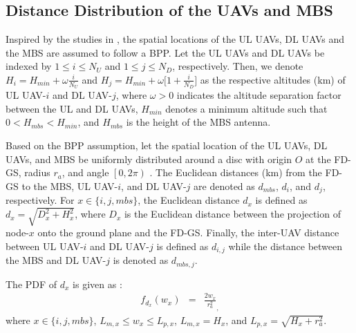\subsection{Distance Distribution of the UAVs and MBS}

Inspired by the studies in \cite{chetlur2017downlink, wang2018modeling, ernest2019hybrid}, the spatial locations of the UL UAVs, DL UAVs and the MBS are assumed to follow a BPP. Let the UL UAVs and DL UAVs be indexed by $1 \leq i \leq N_U$ and $1 \leq j \leq N_D$, respectively. Then, we denote $H_i = H_{min} + \omega \frac{i}{N_U}$ and $H_j = H_{min} + \omega \big[ 1+\frac{i}{N_D} \big]$ as the respective altitudes (km) of UL UAV-$i$ and DL UAV-$j$, where $\omega>0$ indicates the altitude separation factor between the UL and DL UAVs, $H_{min}$ denotes a minimum altitude such that $0<H_{mbs}<H_{min}$, and $H_{mbs}$ is the height of the MBS antenna.

Based on the BPP assumption, let the spatial location of the UL UAVs, DL UAVs, and MBS be uniformly distributed around a disc with origin $O$ at the FD-GS, radius $r_a$, and angle $\left[0,2\pi\right)$ \cite{chetlur2017downlink,ernest2019hybrid}. The Euclidean distances (km) from the FD-GS to the MBS, UL UAV-$i$, and DL UAV-$j$ are denoted as $d_{mbs}$, $d_{i}$, and $d_{j}$, respectively. For $x \in \{i,j,mbs\}$, the Euclidean distance $d_x$ is defined as $d_{x} = \sqrt{D_{x}^2 + H_{x}^2}$, where $D_{x}$ is the Euclidean distance between the projection of node-$x$ onto the ground plane and the FD-GS. Finally, the inter-UAV distance between UL UAV-$i$ and DL UAV-$j$ is defined as $d_{i,j}$ while the distance between the MBS and DL UAV-$j$ is denoted as $d_{mbs,j}$.

The PDF of $d_x$ is given as \cite[eq. (3)]{chetlur2017downlink}:
\begin{eqnarray}
f_{d_{x}}(w_x) &=&  \frac{2w_x}{r_a^2}_,
\end{eqnarray}
where $x \in \{i,j,mbs\}$, $L_{m,x} \leq w_{x} \leq L_{p,x}$, $L_{m,x} = H_{x}$, and $L_{p,x} = \sqrt{H_x+r_{a}^2}$. 

